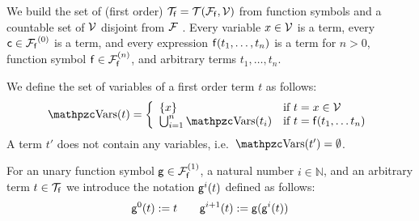 
\begin{definition}\label{def:terms}
	We build the set of (first order) \( \mcTf = \mcTFfV \)
	from function symbols and a
	countable set of \( \mcV \) disjoint from \( \mcF \) \!.
	Every variable \( x\in\mcV \) is a term,
	every  \( \mc\in\mcFf^{(0)} \) is a term,
	and every expression \( \mf(t_1,\ldots,t_n) \) is a term
	for \( n>0 \), function symbol \( \mf\in\mcFfn \),
	and arbitrary terms \( t_1,\ldots,t_n \).
\end{definition}

\begin{definition}\label{def:term:vars}\label{def:term:ground}
	We define the set of variables of a first order term \( t \) as follows:
	\begin{gather*}
	\MDEFINE{\var(t)}{ll}{
		\{ x \} & \text{if } t = x \in \mcV \\
		\bigcup_{i=1}^n \var(t_i) & \text{if }  t = \mf(t_1, \ldots t_n)
	}
	\end{gather*}
	A  term \( t' \) does not contain any variables, i.e.~\( \var(t') = \emptyset \).
\end{definition}

\begin{definition}\label{def:unary:power}
	For an unary function symbol \( \mg\in\mcFfn[1] \), a natural number
	\( i\in\mathbb{N} \), and an arbitrary term \( t\in\mcTf \) we introduce the notation \( \mg^i(t) \) defined as follows:
	\[
	\mg^0(t) := t \qquad
	\mg^{i+1}(t) := \mg(\mg^i(t))
	\]
\end{definition}

